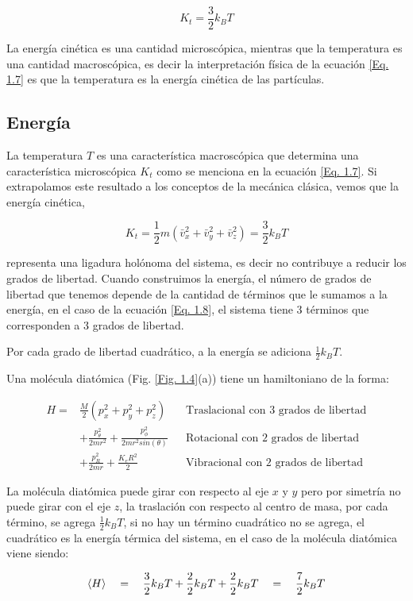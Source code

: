 \documentclass[11pt,fleqn]{book}
\begin{document}
\begin{equation}
    K_{t}=\frac{3}{2}k_{B}T
    \label{Eq. 1.7}
\end{equation}

La energía cinética es una  cantidad microscópica, mientras que la temperatura es una cantidad macroscópica, es decir la interpretación física de la ecuación \ref{Eq. 1.7} es que la temperatura es la energía cinética de las partículas.

\subsection{Energía}

La temperatura $T$ es una característica macroscópica que determina una característica microscópica $K_{t}$ como se menciona en la ecuación \ref{Eq. 1.7}. Si extrapolamos este resultado a los conceptos de la mecánica clásica, vemos que la energía cinética,

\begin{equation}
    K_{t}=\frac{1}{2}m\left(\bar{v}_{x}^{2}+\bar{v}_{y}^{2}+\bar{v}_{z}^{2}\right)=\frac{3}{2}k_{B}T
    \label{Eq. 1.8}
\end{equation}

representa una ligadura holónoma del sistema, es decir no contribuye a reducir los grados de libertad. Cuando construimos la energía, el número de grados de libertad que tenemos depende de la cantidad de términos que le sumamos a la energía, en el caso de la ecuación \ref{Eq. 1.8}, el sistema tiene 3 términos que corresponden a 3 grados de libertad.

\begin{theorem}[Equipartición]
Por cada grado de libertad cuadrático, a la energía se adiciona $\frac{1}{2}k_{B}T$.

\begin{example}
Una molécula diatómica (Fig. \ref{Fig. 1.4}(a)) tiene un hamiltoniano de la forma:

\begin{align*}
      H=&\frac{M}{2}\left(p_{x}^{2}+p_{y}^{2}+p_{z}^{2}\right) && \text{Traslacional con 3 grados de libertad}\\
      &+\frac{p_{\theta}^{2}}{2mr^{2}}+\frac{p_{\phi}^{2}}{2mr^{2}sin(\theta)} && \text{Rotacional con 2 grados de libertad}\\
      &+\frac{p_{R}^{2}}{2mr}+\frac{K_{e}R^{2}}{2} && \text{Vibracional con 2 grados de libertad}
\end{align*}

\noindent La molécula diatómica puede girar con respecto al eje $x$ y $y$ pero por simetría no puede girar con el eje $z$, la traslación con respecto al centro de masa, por cada término, se agrega $\frac{1}{2}k_{B}T$, si no hay un término cuadrático no se agrega, el cuadrático es la energía térmica del sistema, en el caso de la molécula diatómica viene siendo:

\begin{equation*}
    \braket{H}\quad=\quad\frac{3}{2}k_{B}T+\frac{2}{2}k_{B}T+\frac{2}{2}k_{B}T\quad=\quad\frac{7}{2}k_{B}T
\end{equation*}
\end{example}
\end{theorem}
\end{document}
